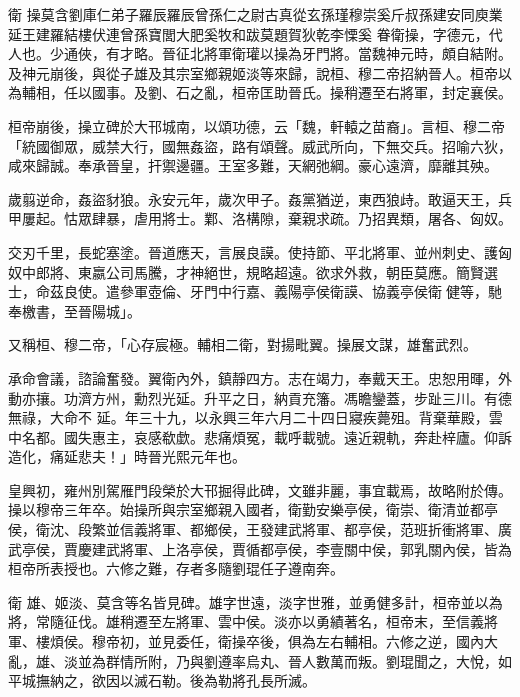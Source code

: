 
\begin{pinyinscope}

 衛
 操莫含劉庫仁弟子羅辰羅辰曾孫仁之尉古真從玄孫瑾穆崇奚斤叔孫建安同庾業延王建羅結樓伏連曾孫寶閭大肥奚牧和跋莫題賀狄乾李慄奚
 眷衛操，字德元，代人也。少通俠，有才略。晉征北將軍衛瓘以操為牙門將。當魏神元時，頗自結附。及神元崩後，與從子雄及其宗室鄉親姬淡等來歸，說桓、穆二帝招納晉人。桓帝以為輔相，任以國事。及劉、石之亂，桓帝匡助晉氏。操稍遷至右將軍，封定襄侯。



 桓帝崩後，操立碑於大邗城南，以頌功德，云「魏，軒轅之苗裔」。言桓、穆二帝「統國御眾，威禁大行，國無姦盜，路有頌聲。威武所向，下無交兵。招喻六狄，咸來歸誠。奉承晉皇，扞禦邊疆。王室多難，天網弛綱。豪心遠濟，靡離其殃。



 歲翦逆命，姦盜豺狼。永安元年，歲次甲子。姦黨猶逆，東西狼歭。敢逼天王，兵
 甲屢起。怙眾肆暴，虐用將士。鄴、洛構隙，棄親求疏。乃招異類，屠各、匈奴。



 交刃千里，長蛇塞塗。晉道應天，言展良謨。使持節、平北將軍、並州刺史、護匈奴中郎將、東嬴公司馬騰，才神絕世，規略超遠。欲求外救，朝臣莫應。簡賢選士，命茲良使。遣參軍壺倫、牙門中行嘉、義陽亭侯衛謨、協義亭侯衛健等，馳奉檄書，至晉陽城」。



 又稱桓、穆二帝，「心存宸極。輔相二衛，對揚毗翼。操展文謀，雄奮武烈。



 承命會議，諮論奮發。翼衛內外，鎮靜四方。志在竭力，奉戴天王。忠恕用暉，外動亦攘。功濟方州，勳烈光延。升平之日，納貢充籓。馮瞻鑾蓋，步趾三川。有德無祿，大命不
 延。年三十九，以永興三年六月二十四日寢疾薨殂。背棄華殿，雲中名都。國失惠主，哀感欷歔。悲痛煩冤，載呼載號。遠近親軌，奔赴梓廬。仰訴造化，痛延悲夫！」時晉光熙元年也。



 皇興初，雍州別駕雁門段榮於大邗掘得此碑，文雖非麗，事宜載焉，故略附於傳。操以穆帝三年卒。始操所與宗室鄉親入國者，衛勤安樂亭侯，衛崇、衛清並都亭侯，衛沈、段繁並信義將軍、都鄉侯，王發建武將軍、都亭侯，范班折衝將軍、廣武亭侯，賈慶建武將軍、上洛亭侯，賈循都亭侯，李壹關中侯，郭乳關內侯，皆為桓帝所表授也。六修之難，存者多隨劉琨任子遵南奔。



 衛
 雄、姬淡、莫含等名皆見碑。雄字世遠，淡字世雅，並勇健多計，桓帝並以為將，常隨征伐。雄稍遷至左將軍、雲中侯。淡亦以勇績著名，桓帝末，至信義將軍、樓煩侯。穆帝初，並見委任，衛操卒後，俱為左右輔相。六修之逆，國內大亂，雄、淡並為群情所附，乃與劉遵率烏丸、晉人數萬而叛。劉琨聞之，大悅，如平城撫納之，欲因以滅石勒。後為勒將孔長所滅。




\end{pinyinscope}
